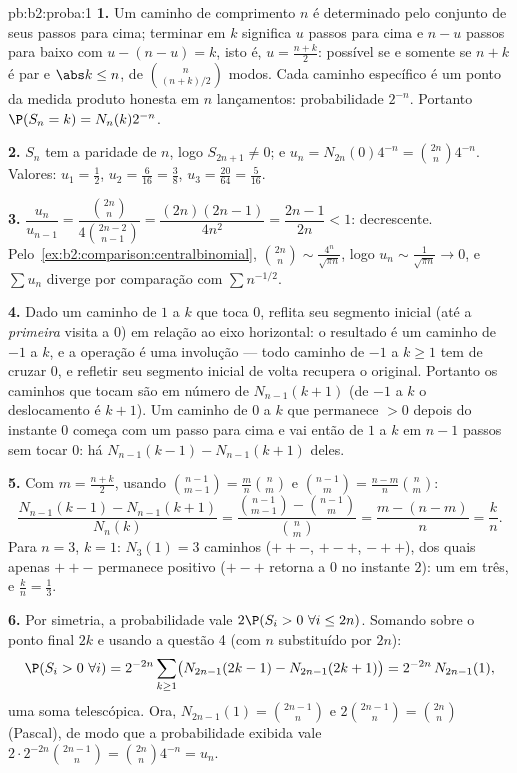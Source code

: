 \begin{solution}{pb:b2:proba:1}
\textbf{1.} Um caminho de comprimento $n$ é determinado pelo conjunto de
seus passos para cima; terminar em $k$ significa $u$ passos para cima e $n - u$
passos para baixo com $u - (n - u) = k$, isto é, $u = \frac{n+k}2$:
possível se e somente se $n + k$ é par e $\abs k \leq n$, de
$\binom{n}{(n+k)/2}$ modos. Cada caminho específico é um ponto da
medida produto honesta em $n$ lançamentos: probabilidade $2^{-n}$.
Portanto $\P(S_n = k) = N_n(k)2^{-n}$.

\textbf{2.} $S_n$ tem a paridade de $n$, logo $S_{2n+1} \neq
0$; e $u_n = N_{2n}(0)4^{-n} = \binom{2n}n4^{-n}$. Valores:
$u_1 = \frac12$, $u_2 = \frac6{16} = \frac38$, $u_3 =
\frac{20}{64} = \frac5{16}$.

\textbf{3.} $\dfrac{u_n}{u_{n-1}} =
\dfrac{\binom{2n}n}{4\binom{2n-2}{n-1}} =
\dfrac{(2n)(2n-1)}{4n^2} = \dfrac{2n-1}{2n} < 1$: decrescente.
Pelo~\cref{ex:b2:comparison:centralbinomial}, $\binom{2n}n \sim
\frac{4^n}{\sqrt{\pi n}}$, logo $u_n \sim \frac1{\sqrt{\pi n}}
\to 0$, e $\sum u_n$ diverge por comparação com $\sum
n^{-1/2}$.

\textbf{4.} Dado um caminho de $1$ a $k$ que toca $0$,
reflita seu segmento inicial (até a \emph{primeira} visita a
$0$) em relação ao eixo horizontal: o resultado é um caminho de
$-1$ a $k$, e a operação é uma involução --- todo
caminho de $-1$ a $k \geq 1$ tem de cruzar $0$, e refletir
seu segmento inicial de volta recupera o original. Portanto os
caminhos que tocam são em número de $N_{n-1}(k + 1)$ (de $-1$ a $k$ o
deslocamento é $k + 1$). Um caminho de $0$ a $k$ que permanece $>
0$ depois do instante $0$ começa com um passo para cima e vai então de
$1$ a $k$ em $n - 1$ passos sem tocar $0$: há
$N_{n-1}(k-1) - N_{n-1}(k+1)$ deles.

\textbf{5.} Com $m = \frac{n+k}2$, usando
$\binom{n-1}{m-1} = \frac mn\binom nm$ e $\binom{n-1}{m} =
\frac{n-m}n\binom nm$:
\[
\frac{N_{n-1}(k-1) - N_{n-1}(k+1)}{N_n(k)}
= \frac{\binom{n-1}{m-1} - \binom{n-1}{m}}{\binom nm}
= \frac{m - (n - m)}{n} = \frac kn .
\]
Para $n = 3$, $k = 1$: $N_3(1) = 3$ caminhos ($++-$, $+-+$,
$-++$), dos quais apenas $++-$ permanece positivo ($+-+$ retorna a
$0$ no instante $2$): um em três, e $\frac kn = \frac13$.

\textbf{6.} Por simetria, a probabilidade vale $2\P(S_i > 0\ \forall
i \leq 2n)$. Somando sobre o ponto final $2k$ e usando
a questão 4 (com $n$ substituído por $2n$):
\[
\P(S_i > 0\ \forall i) = 2^{-2n}\sum_{k\geq1}
\bigl(N_{2n-1}(2k-1) - N_{2n-1}(2k+1)\bigr)
= 2^{-2n}\,N_{2n-1}(1),
\]
uma soma telescópica. Ora, $N_{2n-1}(1) = \binom{2n-1}{n}$ e
$2\binom{2n-1}n = \binom{2n}n$ (Pascal), de modo que a probabilidade
exibida vale $2\cdot2^{-2n}\binom{2n-1}n =
\binom{2n}n4^{-n} = u_n$.


\end{solution}

